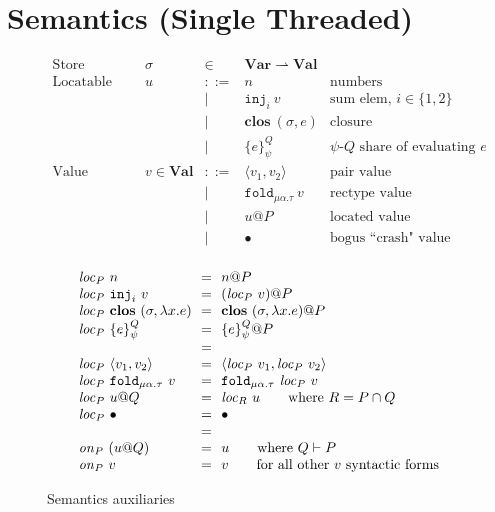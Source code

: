 \documentclass[10pt]{article}
\makeatletter
\newcommand{\kw}[1]{\ensuremath{\mathtt{#1}}}
\newcommand{\trec}[2]{\ensuremath{\mu {#1}.{#2}}}
\newcommand{\einj}[2]{\ensuremath{\kw{inj}_{#1}~{#2}}}
\newcommand{\epair}[2]{\ensuremath{\langle {#1}, {#2} \rangle}}
\newcommand{\elam}[2]{\ensuremath{\lambda {#1}.{#2}}}
\newcommand{\efold}[2]{\ensuremath{\kw{fold}_{#1}~{#2}}}
\newcommand{\vshare}[3]{\ensuremath{\{{#3}\}^{#1}_{#2}}}
\newcommand{\vloc}[2]{\ensuremath{{#1}\kw{@}{#2}}}
\newcommand{\vclos}[2]{\ensuremath{\mathbf{clos}~({#1},{#2})}}
\newcommand{\vcrash}{\ensuremath{\bullet}}
\newcommand{\env}{\ensuremath{\sigma}}
\newcommand{\locof}[2]{\ensuremath{\mathit{loc}_{#1}~{#2}}}
\newcommand{\getat}[2]{\ensuremath{\mathit{on}_{#1}~{#2}}}
\makeatother
\begin{document}
\section{Semantics (Single Threaded)}
\label{sec:STsemantics}

\begin{figure}
  \[\begin{array}{rlcll}
      \text{Store} & \sigma & \in & \mathbf{Var} \rightharpoonup \mathbf{Val}\\
      \text{Locatable value} & u & ::=  & n & \text{numbers} \\
                             && \mid & \einj{i}{v} & \text{sum elem, }i \in \{1,2\}\\
                             && \mid & \vclos{\env}{e}  & \text{closure} \\
                             && \mid & \vshare{Q}{\psi}{e} & \text{$\psi$-$Q$ share of evaluating $e$} \\
      \text{Value} & v  \in \mathbf{Val} & ::=  & \epair{v_1}{v_2} & \text{pair value}\\
                       && \mid & \efold{\trec{\alpha}{\tau}}{v} & \text{rectype value}\\
                   && \mid & \vloc{u}{P} & \text{located value}\\
                   && \mid & \vcrash & \text{bogus ``crash" value}\\
    \end{array}
  \]

\[\begin{array}{l@{~~=~~}l}
    \locof{P}{n} & \vloc{n}{P} \\
    \locof{P}{\einj{i}{v}} & \vloc{(\locof{P}{v})}{P} \\
    \locof{P}{\vclos{\env}{\elam{x}{e}}} & \vloc{\vclos{\env}{\elam{x}{e}}}{P}\\
    \locof{P}{\vshare{Q}{\psi}{e}} & \vloc{\vshare{Q}{\psi}{e}}{P}
    \\ \\
    \locof{P}{\epair{v_1}{v_2}} & \epair{\locof{P}{v_1}}{\locof{P}{v_2}}\\
    \locof{P}{ \efold{\trec{\alpha}{\tau}}{v}} &  \efold{\trec{\alpha}{\tau}}{\locof{P}{v}}\\
    \locof{P}{\vloc{u}{Q}} & \locof{R}{u} \qquad\text{where }R = P \cap Q\\
    \locof{P}{\vcrash} & \vcrash
    \\ \\
    \getat{P}{(\vloc{u}{Q})} & u \qquad \text{where }Q \vdash P\\
    \getat{P}{v} & v \qquad \text{for all other $v$ syntactic forms}\\
  \end{array}
\]
\caption{Semantics auxiliaries}
\label{fig:auxsem}
\end{figure}
\end{document}

